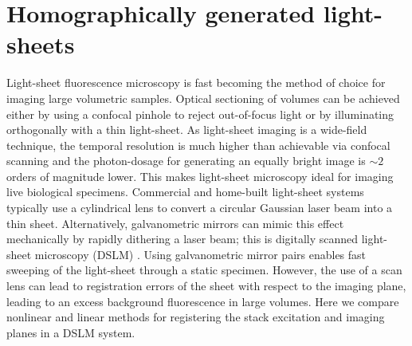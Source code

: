 
\chapter{Homographically generated light-sheets}

\ifpdf
    \graphicspath{{Chapters/homography/Figs/Raster/}{Chapters/homography/Figs/PDF/}{Chapters/homography/Figs/}}
\else
    \graphicspath{{Chapters/homography/Figs/Vector/}{Chapters/homography/Figs/}}
\fi

Light-sheet fluorescence microscopy is fast becoming the method of choice for imaging large volumetric samples.
Optical sectioning of volumes can be achieved either by using a confocal pinhole to reject out-of-focus light or by illuminating orthogonally with a thin light-sheet.
As light-sheet imaging is a wide-field technique, the temporal resolution is much higher than achievable via confocal scanning and the photon-dosage for generating an equally bright image is $\sim 2$ orders of magnitude lower.
This makes light-sheet microscopy ideal for imaging live biological specimens\cite{huisken_optical_2004-1}.
Commercial and home-built\cite{pitrone_openspim:_2013} light-sheet systems typically use a cylindrical lens to convert a circular Gaussian laser beam into a thin sheet.
Alternatively, galvanometric mirrors can mimic this effect mechanically by rapidly dithering a laser beam; this is digitally scanned light-sheet microscopy (DSLM)%
\cite{keller_fast_2010-1}.
Using galvanometric mirror pairs enables fast sweeping of the light-sheet through a static specimen.
However, the use of a scan lens can lead to registration errors of the sheet with respect to the imaging plane, leading to an excess background fluorescence in large volumes.
Here we compare nonlinear and linear methods for registering the stack excitation and imaging planes in a DSLM system.

